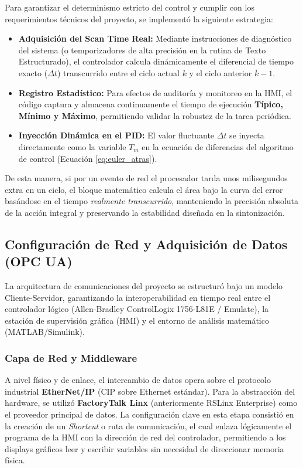 Para garantizar el determinismo estricto del control y cumplir con los requerimientos técnicos del proyecto, se implementó la siguiente estrategia:
\begin{itemize}
    \item \textbf{Adquisición del Scan Time Real:} Mediante instrucciones de diagnóstico del sistema (o temporizadores de alta precisión en la rutina de Texto Estructurado), el controlador calcula dinámicamente el diferencial de tiempo exacto ($\Delta t$) transcurrido entre el ciclo actual $k$ y el ciclo anterior $k-1$.
    \item \textbf{Registro Estadístico:} Para efectos de auditoría y monitoreo en la HMI, el código captura y almacena continuamente el tiempo de ejecución \textbf{Típico, Mínimo y Máximo}, permitiendo validar la robustez de la tarea periódica.
    \item \textbf{Inyección Dinámica en el PID:} El valor fluctuante $\Delta t$ se inyecta directamente como la variable $T_m$ en la ecuación de diferencias del algoritmo de control (Ecuación \ref{eq:euler_atras}). 
\end{itemize}

De esta manera, si por un evento de red el procesador tarda unos milisegundos extra en un ciclo, el bloque matemático calcula el área bajo la curva del error basándose en el tiempo \textit{realmente transcurrido}, manteniendo la precisión absoluta de la acción integral y preservando la estabilidad diseñada en la sintonización.
 \clearpage
\subsection{Configuración de Red y Adquisición de Datos (OPC UA)}

La arquitectura de comunicaciones del proyecto se estructuró bajo un modelo Cliente-Servidor, garantizando la interoperabilidad en tiempo real entre el controlador lógico (Allen-Bradley ControlLogix 1756-L81E / Emulate), la estación de supervisión gráfica (HMI) y el entorno de análisis matemático (MATLAB/Simulink).

\subsubsection{Capa de Red y Middleware}
A nivel físico y de enlace, el intercambio de datos opera sobre el protocolo industrial \textbf{EtherNet/IP} (CIP sobre Ethernet estándar). Para la abstracción del hardware, se utilizó \textbf{FactoryTalk Linx} (anteriormente RSLinx Enterprise) como el proveedor principal de datos. La configuración clave en esta etapa consistió en la creación de un \textit{Shortcut} o ruta de comunicación, el cual enlaza lógicamente el programa de la HMI con la dirección de red del controlador, permitiendo a los displays gráficos leer y escribir variables sin necesidad de direccionar memoria física.

